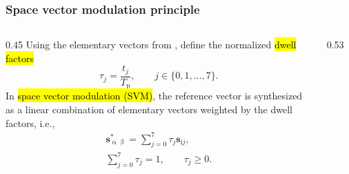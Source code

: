 \begin{frame}
    \frametitle{Space vector modulation principle}
    \small
    \begin{columns}[T,onlytextwidth]
        \begin{column}{0.45\textwidth}
            Using the elementary vectors from , define the normalized \hl{dwell factors}
            \begin{equation}
                \tau_j = \frac{t_j}{T_\mathrm{p}}, \qquad j\in\{0,1,\ldots,7\}.
            \end{equation}
            In \hl{space vector modulation (SVM)}, the reference vector is synthesized as a linear combination of elementary vectors weighted by the dwell factors, i.e.,
            \begin{equation}
                \begin{gathered}
                    \bm{s}_{\upalpha\upbeta}^* = \sum_{j=0}^7 \tau_j \bm{s}_{\mathrm{i}j},\\
                    \sum_{j=0}^7 \tau_j = 1, \qquad
                    \tau_j\geq 0.
                \end{gathered}
                \label{eq:SVM_assignment_problem}
            \end{equation}
        \end{column}
        \begin{column}{0.53\textwidth}
            \centering
            \vspace{-0.15cm}
            \begin{figure}
\end{figure}
\end{column}
\end{columns}
\end{frame}
